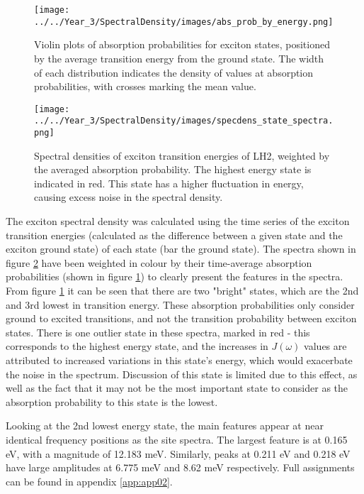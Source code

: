 \begin{figure}
    \centering
    \texttt{[image: ../../Year\_3/SpectralDensity/images/abs\_prob\_by\_energy.png]}
    \caption{Violin plots of absorption probabilities for exciton states, positioned
    by the average transition energy from the ground state. The width of each distribution 
    indicates the density of values at absorption probabilities, with crosses marking
    the mean value.}
    \label{fig:absorption_probabilities}
\end{figure}

\begin{figure}
    \centering
    \texttt{[image: ../../Year\_3/SpectralDensity/images/specdens\_state\_spectra.png]}
    \caption{Spectral densities of exciton transition energies of LH2, weighted by
    the averaged absorption probability. The highest energy state is indicated in 
    red. This state has a higher fluctuation in energy, causing excess noise in
    the spectral density.}
    \label{fig:specdens_states}
\end{figure}

The exciton spectral density was calculated using the time series of the exciton
transition energies (calculated as the difference between a given state and the
exciton ground state) of each state (bar the ground state). The spectra shown in 
figure \ref{fig:specdens_states} have been weighted in colour by their time-average
absorption probabilities (shown in figure \ref{fig:absorption_probabilities}) to
clearly present the features in the spectra. From figure \ref{fig:absorption_probabilities}
it can be seen that there are two "bright" states, which are the 2nd and 3rd lowest
in transition energy. These absorption probabilities only consider ground to excited 
transitions, and not the transition probability between exciton states. There is
one outlier state in these spectra, marked in red - this corresponds to the highest
energy state, and the increases in $J\left(\omega\right)$ values are attributed 
to increased variations in this state's energy, which would exacerbate the noise 
in the spectrum. Discussion of this state is limited due to this effect, as well 
as the fact that it may not be the most important state to consider as the absorption
probability to this state is the lowest.

Looking at the 2nd lowest energy state, the main features appear at near identical
frequency positions as the site spectra. The largest feature is at 0.165 eV, with
a magnitude of 12.183 meV. Similarly, peaks at 0.211 eV and 0.218 eV have large
amplitudes at 6.775 meV and 8.62 meV respectively. Full assignments can be found
in appendix \ref{app:app02}.

